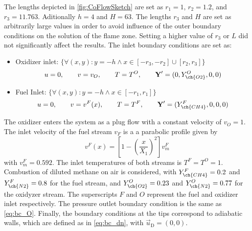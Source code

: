 The lengths depicted in \cref{fig:CoFlowSketch} are set as $ r_1 = 1$, $ r_2 = 1.2$, and $ r_3 = 11.763$. Aditionally $ h = 4$ and $ H = 63$. The lengths $ r_3$ and $H$ are set as arbitrarily large values in order to avoid influence of the outer boundary conditions on the solution of the flame zone. Setting a higher value of $ r_3$ or $ L$ did not significantly affect the results. The inlet boundary conditions are set as: 
\begin{itemize}
	\item Oxidizer inlet: $\{\forall (x,y): y = -h \land x \in [-r_3,-r_2]\cup[r_2,r_3]\}$\\
	\begin{equation*}
		u = 0,\qquad v= v_O, \qquad T = T^O, \qquad \vec{Y}' = (0,Y^O_{\ch{O2}},0,0)
	\end{equation*}
\item Fuel Inlet: $\{\forall (x,y): y = -h \land x \in [-r_1,r_1]\} $ \\
\begin{equation*}
	u = 0,\qquad v= v^F(x), \qquad T = T^F, \qquad \vec{Y}' = (Y^F_{\ch{CH4}},0,0,0)
\end{equation*}
\end{itemize}
The oxidizer enters the system as a plug flow with a constant velocity of $v_O = 1 $. The inlet velocity of the fuel stream $v_F$ is a a parabolic profile given by
\begin{equation}
	v^F(x) = \left[1-\left(\frac{x}{X_1}\right)^2\right]v_m^F
\end{equation}
with $v^F_m =0.592$.  The inlet temperatures of both streams is  $T^F = T^O = 1$. Combustion of diluted methane on air is considered, with $Y^F_{\ch{CH4}} = 0.2$ and $Y^F_{\ch{N2}} = 0.8$ for the fuel stream, and  $Y^O_{\ch{O2}} = 0.23$ and $Y^O_{\ch{N2}} = 0.77$ for the oxidyzer stream. The superscripts $F$ and $O$ represent the fuel and oxidizer inlet respectively. The pressure outlet boundary condition is the same as \cref{eq:bc_O}. Finally, the boundary conditions at the tips correspond to adiabatic walls, which are defined as in \cref{eq:bc_dn}, with $\vec{u}_{\text{D}} = (0,0)$.             

